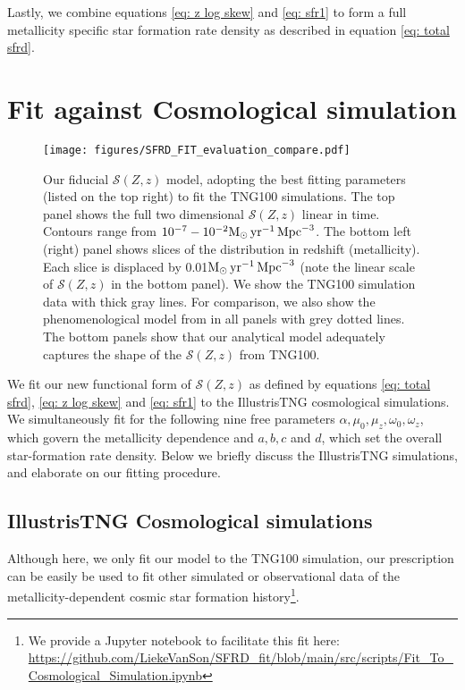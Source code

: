 \documentclass[twocolumn]{aastex631}
\newcommand{\Msun}{\ensuremath{\rm{M}_{\odot}}\xspace}
\newcommand{\yr}{\ensuremath{\,\rm{yr}}\xspace}
\newcommand{\Mpc}{\ensuremath{\,\rm{Mpc}}\xspace}
\newcommand{\SFRDzZ}{\ensuremath{\mathcal{S}(Z,z)}\xspace}
\begin{document}
Lastly, we combine equations \ref{eq: z log skew} and \ref{eq: sfr1} to form a full metallicity specific star formation rate density as described in equation \ref{eq: total sfrd}.


\section{Fit against Cosmological simulation \label{sec: fit against tng}}

\begin{figure*}
\centering
{}
\texttt{[image: figures/SFRD\_FIT\_evaluation\_compare.pdf]}
\caption{Our fiducial \SFRDzZ model, adopting the best fitting parameters (listed on the top right) to fit the TNG100 simulations. The top panel shows the full two dimensional \SFRDzZ linear in time. Contours range from $10^{-7} - 10^{-2} \Msun \yr^{-1}\Mpc^{-3}$. 
The bottom left (right) panel shows slices of the distribution in redshift (metallicity). Each slice is displaced by 0.01$\Msun \yr^{-1}\Mpc^{-3}$ (note the linear scale of \SFRDzZ in the bottom panel). We show the TNG100 simulation data with thick gray lines. 
For comparison, we also show the phenomenological model from \protect\cite{Neijssel+2019} in all panels with grey dotted lines. The bottom panels show that our analytical model adequately captures the shape of the \SFRDzZ from TNG100.
 \label{fig: fit SFRD}}
\end{figure*}
We fit our new functional form of \SFRDzZ as defined by equations \ref{eq: total sfrd}, \ref{eq: z log skew} and \ref{eq: sfr1} to the IllustrisTNG cosmological simulations. 
We simultaneously fit for the following nine free parameters $\alpha, \mu_0, \mu_z, \omega_0, \omega_z$, which govern the metallicity dependence and $a,b, c$ and $d$, which set the overall star-formation rate density.
Below we briefly discuss the IllustrisTNG simulations, and elaborate on our fitting procedure.




\subsection{IllustrisTNG Cosmological simulations}
Although here, we only fit our model to the TNG100 simulation, our prescription can be easily be used to fit other simulated or observational data of the metallicity-dependent cosmic star formation history\footnote{We provide a Jupyter notebook to facilitate this fit here: \url{https://github.com/LiekeVanSon/SFRD_fit/blob/main/src/scripts/Fit_To_Cosmological_Simulation.ipynb} }.
\end{document}
